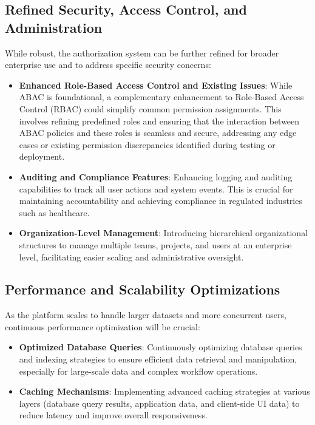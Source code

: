 \subsection{Refined Security, Access Control, and Administration}
While robust, the authorization system can be further refined for broader enterprise use and to address specific security concerns:
\begin{itemize}
    \item \textbf{Enhanced Role-Based Access Control and Existing Issues}: While ABAC is foundational, a complementary enhancement to Role-Based Access Control (RBAC) could simplify common permission assignments. This involves refining predefined roles and ensuring that the interaction between ABAC policies and these roles is seamless and secure, addressing any edge cases or existing permission discrepancies identified during testing or deployment.
    \item \textbf{Auditing and Compliance Features}: Enhancing logging and auditing capabilities to track all user actions and system events. This is crucial for maintaining accountability and achieving compliance in regulated industries such as healthcare.
    \item \textbf{Organization-Level Management}: Introducing hierarchical organizational structures to manage multiple teams, projects, and users at an enterprise level, facilitating easier scaling and administrative oversight.
\end{itemize}

\subsection{Performance and Scalability Optimizations}
As the platform scales to handle larger datasets and more concurrent users, continuous performance optimization will be crucial:
\begin{itemize}
    \item \textbf{Optimized Database Queries}: Continuously optimizing database queries and indexing strategies to ensure efficient data retrieval and manipulation, especially for large-scale data and complex workflow operations.
    \item \textbf{Caching Mechanisms}: Implementing advanced caching strategies at various layers (database query results, application data, and client-side UI data) to reduce latency and improve overall responsiveness.
\end{itemize}

